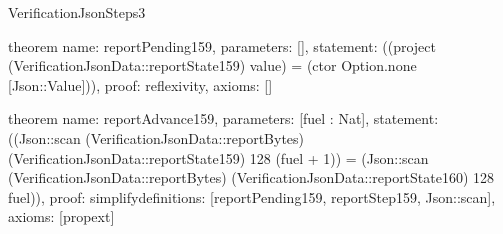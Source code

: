 \begin{lexlean}{VerificationJsonSteps3}
\begin{semanticmodule}
theorem{
  name: reportPending159,
  parameters: [],
  statement: ((project (VerificationJsonData::reportState159) value) = (ctor Option.none [Json::Value])),
  proof: reflexivity{},
  axioms: []
}

theorem{
  name: reportAdvance159,
  parameters: [fuel : Nat],
  statement: ((Json::scan (VerificationJsonData::reportBytes) (VerificationJsonData::reportState159) 128 (fuel + 1)) = (Json::scan (VerificationJsonData::reportBytes) (VerificationJsonData::reportState160) 128 fuel)),
  proof: simplify{definitions: [reportPending159, reportStep159, Json::scan]},
  axioms: [propext]
}

\end{semanticmodule}
\end{lexlean}
